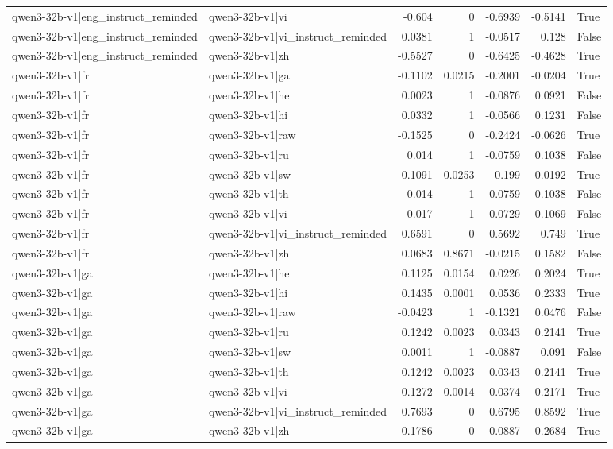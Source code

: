 \begin{table}
\begin{tabular}{l l r r r r l}
qwen3-32b-v1|eng_instruct_reminded & qwen3-32b-v1|vi & -0.604 & 0 & -0.6939 & -0.5141 & True \\
qwen3-32b-v1|eng_instruct_reminded & qwen3-32b-v1|vi_instruct_reminded & 0.0381 & 1 & -0.0517 & 0.128 & False \\
qwen3-32b-v1|eng_instruct_reminded & qwen3-32b-v1|zh & -0.5527 & 0 & -0.6425 & -0.4628 & True \\
qwen3-32b-v1|fr & qwen3-32b-v1|ga & -0.1102 & 0.0215 & -0.2001 & -0.0204 & True \\
qwen3-32b-v1|fr & qwen3-32b-v1|he & 0.0023 & 1 & -0.0876 & 0.0921 & False \\
qwen3-32b-v1|fr & qwen3-32b-v1|hi & 0.0332 & 1 & -0.0566 & 0.1231 & False \\
qwen3-32b-v1|fr & qwen3-32b-v1|raw & -0.1525 & 0 & -0.2424 & -0.0626 & True \\
qwen3-32b-v1|fr & qwen3-32b-v1|ru & 0.014 & 1 & -0.0759 & 0.1038 & False \\
qwen3-32b-v1|fr & qwen3-32b-v1|sw & -0.1091 & 0.0253 & -0.199 & -0.0192 & True \\
qwen3-32b-v1|fr & qwen3-32b-v1|th & 0.014 & 1 & -0.0759 & 0.1038 & False \\
qwen3-32b-v1|fr & qwen3-32b-v1|vi & 0.017 & 1 & -0.0729 & 0.1069 & False \\
qwen3-32b-v1|fr & qwen3-32b-v1|vi_instruct_reminded & 0.6591 & 0 & 0.5692 & 0.749 & True \\
qwen3-32b-v1|fr & qwen3-32b-v1|zh & 0.0683 & 0.8671 & -0.0215 & 0.1582 & False \\
qwen3-32b-v1|ga & qwen3-32b-v1|he & 0.1125 & 0.0154 & 0.0226 & 0.2024 & True \\
qwen3-32b-v1|ga & qwen3-32b-v1|hi & 0.1435 & 0.0001 & 0.0536 & 0.2333 & True \\
qwen3-32b-v1|ga & qwen3-32b-v1|raw & -0.0423 & 1 & -0.1321 & 0.0476 & False \\
qwen3-32b-v1|ga & qwen3-32b-v1|ru & 0.1242 & 0.0023 & 0.0343 & 0.2141 & True \\
qwen3-32b-v1|ga & qwen3-32b-v1|sw & 0.0011 & 1 & -0.0887 & 0.091 & False \\
qwen3-32b-v1|ga & qwen3-32b-v1|th & 0.1242 & 0.0023 & 0.0343 & 0.2141 & True \\
qwen3-32b-v1|ga & qwen3-32b-v1|vi & 0.1272 & 0.0014 & 0.0374 & 0.2171 & True \\
qwen3-32b-v1|ga & qwen3-32b-v1|vi_instruct_reminded & 0.7693 & 0 & 0.6795 & 0.8592 & True \\
qwen3-32b-v1|ga & qwen3-32b-v1|zh & 0.1786 & 0 & 0.0887 & 0.2684 & True \\

\end{tabular}
\end{table}

